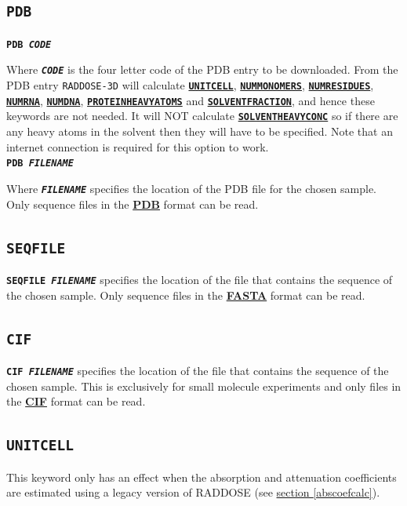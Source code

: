 \documentclass[a4paper]{article}
\newcommand{\RD}{\texttt{RADDOSE-3D}\xspace}
\newcommand{\Keyword}[1]{\texttt{\textbf{#1}}\xspace}
\newcommand{\SB}{\\[0.2em]}
\newcommand{\RDLegacyKeyword}{This keyword only has an effect when the absorption and attenuation coefficients are estimated using a legacy version of RADDOSE (see \hyperref[abscoefcalc]{section \ref*{abscoefcalc}}).\SB
}
\begin{document}
\subsection{\Keyword{PDB}}
\label{pdb}

\noindent \Keyword{PDB \textit{CODE}}

Where \Keyword{\textit{CODE}} is the four letter code of the PDB entry to be downloaded. From the PDB entry \RD will calculate
 \hyperref[unitcell]{\Keyword{UNITCELL}},
 \hyperref[nummonomers]{\Keyword{NUMMONOMERS}},
 \hyperref[numresidues]{\Keyword{NUMRESIDUES}},
 \hyperref[numrna]{\Keyword{NUMRNA}},
 \hyperref[numdna]{\Keyword{NUMDNA}},
 \hyperref[proteinheavyatoms]{\Keyword{PROTEINHEAVYATOMS}} and
 \hyperref[solventfraction]{\Keyword{SOLVENTFRACTION}}, and hence these keywords are not needed.
It will NOT calculate \hyperref[solventheavyconc]{\Keyword{SOLVENTHEAVYCONC}} so if there are any heavy atoms in the solvent then they will have to be specified. Note that an internet connection is required for this option to work. \SB

\noindent \Keyword{PDB \textit{FILENAME}}

Where \Keyword{\textit{FILENAME}} specifies the location of the PDB file for the chosen sample. 
Only sequence files in the \href{https://en.wikipedia.org/wiki/Protein_Data_Bank_(file_format)}{\textbf{PDB}} format can be read. \SB


\subsection{\Keyword{SEQFILE}}
\label{seqfile}

\Keyword{SEQFILE \textit{FILENAME}} specifies the location of the file that contains the sequence of the chosen sample.
Only sequence files in the \href{https://en.wikipedia.org/wiki/FASTA_format}{\textbf{FASTA}} format can be read. \SB

\subsection{\Keyword{CIF}}
\label{cif}

\Keyword{CIF \textit{FILENAME}} specifies the location of the file that contains the sequence of the chosen sample. This is exclusively for small molecule experiments and only files in the \href{https://en.wikipedia.org/wiki/Crystallographic_Information_File}{\textbf{CIF}} format can be read. \SB

\subsection{\Keyword{UNITCELL}}
\label{RDv3Start}
\label{unitcell}
\RDLegacyKeyword
\end{document}
